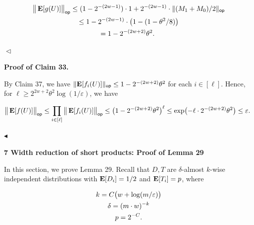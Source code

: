 \documentclass[10pt,a4paper]{article}
\begin{document}
\[\begin{gathered}
\displaystyle\big{\lVert}\mathop{\bf E\/}[g(U)]\big{\rVert}_{\mathsf{op}} \displaystyle\leq(1-2^{-(2w-1)})\cdot 1+2^{-(2w-1)}\cdot\lVert(M_{1}+M_{0})/2\rVert_{\mathsf{op}} \\
\displaystyle\leq 1-2^{-(2w-1)}\cdot\bigl{(}1-(1-\theta^{2}/8)\bigr{)} \\
\displaystyle=1-2^{-(2w+2)}\theta^{2}.\
\end{gathered}\]


$\vartriangleleft$\par





\par\medskip\noindent\textbf{Proof of Claim 33.}\par




By Claim 37, we have $\lVert\mathop{\bf E\/}[f_{i}(U)]\rVert_{\mathsf{op}}\leq 1-2^{-(2w+2)}\theta^{2}$ for each $i\in[\ell]$.
Hence, for $\ell\geq 2^{2w+2}\theta^{2}\log(1/\varepsilon)$, we have\par


\[\begin{gathered}
\big{\lVert}\mathop{\bf E\/}[f(U)]\big{\rVert}_{\mathsf{op}}\leq\prod_{i\in[\ell]}\big{\lVert}\mathop{\bf E\/}[f_{i}(U)]\big{\rVert}_{\mathsf{op}}\leq\bigl{(}1-2^{-(2w+2)}\theta^{2}\bigr{)}^{\ell}\leq\exp\bigl{(}-\ell\cdot 2^{-(2w+2)}\theta^{2}\bigr{)}\leq\varepsilon.\
\end{gathered}\]


$\blacktriangleleft$\par








\par\medskip\noindent\textbf{
7 Width reduction of short products: Proof of Lemma 29
}\par




In this section, we prove Lemma 29.
Recall that $D,T$ are $\delta$-almost $k$-wise independent distributions with $\mathop{\bf E\/}[D_{i}]=1/2$ and $\mathop{\bf E\/}[T_{i}]=p$, where\par


\[\begin{gathered}
\displaystyle k \displaystyle=C\bigl{(}w+\log(m/\varepsilon)\bigr{)} \\
\displaystyle\delta \displaystyle=(m\cdot w)^{-k} \\
\displaystyle p \displaystyle=2^{-C}.
\end{gathered}\]
\end{document}
